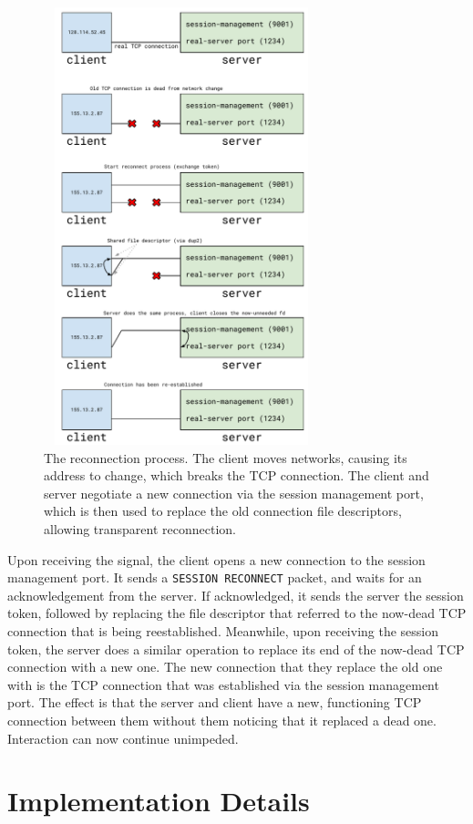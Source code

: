 \documentclass[twocolumn,11pt]{article}
\begin{document}
\begin{figure}
	\centering
	\includegraphics[width=80mm,height=127mm]{fig/reconn_diag}
	\caption{The reconnection process. The client moves networks, causing its
	address to change, which breaks the TCP connection. The client and server
	negotiate a new connection via the session management port, which is then
	used to replace the old connection file descriptors, allowing transparent
	reconnection.}
	\label{fig:recproc}
\end{figure}

Upon receiving the signal, the client opens a new connection to the session
management port. It sends a \texttt{SESSION RECONNECT} packet, and waits for an
acknowledgement from the server. If acknowledged, it sends the server the
session token, followed by replacing the file descriptor that referred to the
now-dead TCP connection that is being reestablished. Meanwhile, upon receiving
the session token, the server does a similar operation to replace its end of the
now-dead TCP connection with a new one. The new connection that they replace the
old one with is the TCP connection that was established via the session
management port. The effect is that the server and client have a new,
functioning TCP connection between them without them noticing that it replaced a
dead one. Interaction can now continue unimpeded.

\section{Implementation Details}
\label{sec:impl}
\end{document}
